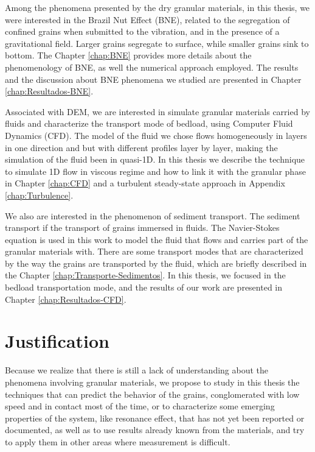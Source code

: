     Among the phenomena presented by the dry granular materials, in this thesis, we were interested in the Brazil Nut Effect (BNE), related to the segregation of confined grains when submitted to the vibration, and in the presence of a gravitational field. Larger grains segregate to surface, while smaller grains sink to bottom. The Chapter \ref{chap:BNE} provides more details about the phenomenology of BNE, as well the numerical approach employed. The results and the discussion about BNE phenomena we studied are presented in Chapter \ref{chap:Resultados-BNE}.

    Associated with DEM, we are interested in simulate granular materials carried by fluids and characterize the transport mode of bedload, using Computer Fluid Dynamics (CFD). The model of the fluid we chose flows homogeneously in layers in one direction and but with different profiles layer by layer, making the simulation of the fluid been in quasi-1D. In this thesis we describe the technique to simulate 1D flow in viscous regime and how to link it with the granular phase in Chapter \ref{chap:CFD} and a turbulent steady-state approach in Appendix \ref{chap:Turbulence}.

    We also are interested in the phenomenon of sediment transport. The sediment transport if the transport of grains immersed in fluids. The Navier-Stokes \cite{Physical_Hydrodynamics, Fluid_Mechanics} equation is used in this work to model the fluid that flows and carries part of the granular materials with. There are some transport modes that are characterized by the way the grains are transported by the fluid, which are briefly described in the Chapter \ref{chap:Transporte-Sedimentos}. In this thesis, we focused in the bedload transportation mode, and the results of our work are presented in Chapter \ref{chap:Resultados-CFD}.

\section{Justification}
\label{sec:justificativa}
    Because we realize that there is still a lack of understanding about the phenomena involving granular materials, we propose to study in this thesis the techniques that can predict the behavior of the grains, conglomerated with low speed and in contact most of the time, or to characterize some emerging properties of the system, like resonance effect, that has not yet been reported or documented, as well as to use results already known from the materials, and try to apply them in other areas where measurement is difficult.

